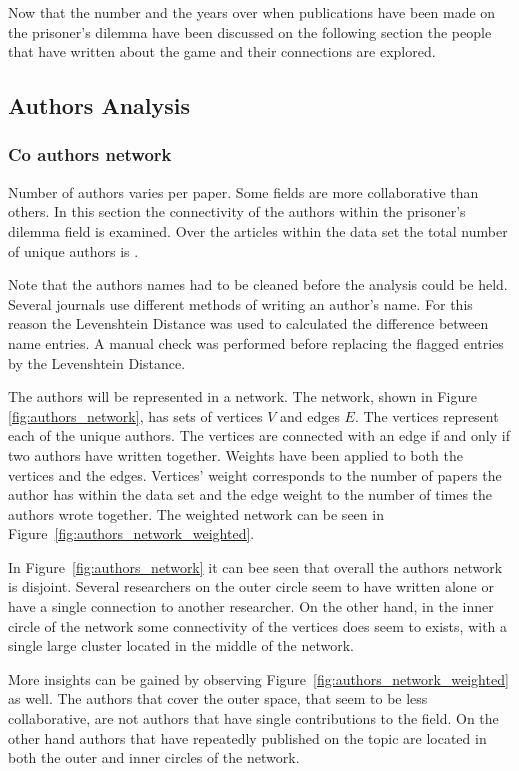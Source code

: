 \documentclass{article}
\newcommand{\uniquetitles}{}
\newcommand{\authors}{}
\begin{document}
Now that the number and the years over when publications have been made on 
the prisoner's dilemma have been discussed on the following section the people 
that have written about the game and their connections are explored.

\subsection{Authors Analysis}

\subsubsection{Co authors network}
Number of authors varies per paper. Some fields are more collaborative than others.
In this section the connectivity of the authors within the prisoner's dilemma
field is examined. Over the \uniquetitles articles within the data set the total
number of unique authors is \authors.

Note that the authors names had to be cleaned before the analysis could be held.
Several journals use different methods of writing an author's name. For this reason
the Levenshtein Distance was used to calculated the difference between name 
entries. A manual check was performed before replacing the flagged entries
by the Levenshtein Distance.

The authors will be represented in a network. The network, shown in Figure
\ref{fig:authors_network}, has sets of vertices \(V\) and edges \(E\). The 
\authors vertices represent each of the unique authors. The vertices are connected
with an edge if and only if two authors have written together. Weights have been
applied to both the vertices and the edges. Vertices' weight corresponds to 
the number of papers the author has within the data set and the edge weight
to the number of times the authors wrote together. The weighted network can be
seen in Figure~\ref{fig:authors_network_weighted}.

In Figure~\ref{fig:authors_network} it can bee seen that overall the authors 
network is disjoint. Several researchers on the outer circle seem to have written
alone or have a single connection to another researcher. On the other hand,
in the inner circle of the network some connectivity of the vertices does seem
to exists, with a single large cluster located in the middle of the network.
 
More insights can be gained by observing Figure~\ref{fig:authors_network_weighted}
as well. The authors that cover the outer space, that seem to be less collaborative,
are not authors that have single contributions to the field. On the other hand
authors that have repeatedly published on the topic are located in both the outer
and inner circles of the network. 
\end{document}
